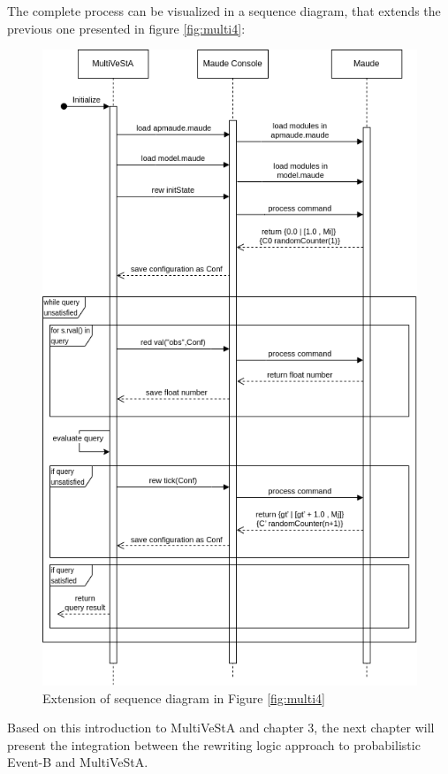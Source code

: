 The complete process can be visualized in a sequence diagram, that extends the previous one presented in figure \ref{fig:multi4}:

\begin{figure}[H]
    \centering
    \includegraphics[scale = 0.5]{images/multi5.png}
    \caption{Extension of sequence diagram in Figure \ref{fig:multi4}}
    \label{fig:multi5}
\end{figure}

Based on this introduction to MultiVeStA and chapter 3, the next chapter will present the integration between the rewriting logic approach to probabilistic Event-B and MultiVeStA.